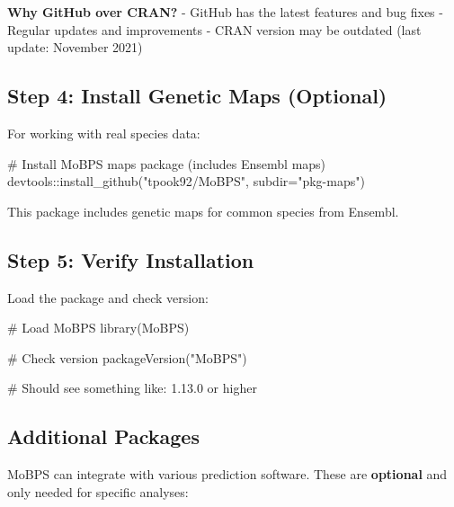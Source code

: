\documentclass[
  letterpaper,
]{book}
\newenvironment{Shaded}{\begin{snugshade}}{\end{snugshade}}
\newcommand{\AttributeTok}[1]{\textcolor[rgb]{0.40,0.45,0.13}{#1}}
\newcommand{\CommentTok}[1]{\textcolor[rgb]{0.37,0.37,0.37}{#1}}
\newcommand{\FunctionTok}[1]{\textcolor[rgb]{0.28,0.35,0.67}{#1}}
\newcommand{\NormalTok}[1]{\textcolor[rgb]{0.00,0.23,0.31}{#1}}
\newcommand{\SpecialCharTok}[1]{\textcolor[rgb]{0.37,0.37,0.37}{#1}}
\newcommand{\StringTok}[1]{\textcolor[rgb]{0.13,0.47,0.30}{#1}}
\begin{document}
\textbf{Why GitHub over CRAN?} - GitHub has the latest features and bug
fixes - Regular updates and improvements - CRAN version may be outdated
(last update: November 2021)

\subsection{Step 4: Install Genetic Maps
(Optional)}\label{step-4-install-genetic-maps-optional}

For working with real species data:

\begin{Shaded}
\begin{Highlighting}[]
\CommentTok{\# Install MoBPS maps package (includes Ensembl maps)}
\NormalTok{devtools}\SpecialCharTok{::}\FunctionTok{install\_github}\NormalTok{(}\StringTok{"tpook92/MoBPS"}\NormalTok{, }\AttributeTok{subdir=}\StringTok{"pkg{-}maps"}\NormalTok{)}
\end{Highlighting}
\end{Shaded}

This package includes genetic maps for common species from Ensembl.

\subsection{Step 5: Verify
Installation}\label{step-5-verify-installation}

Load the package and check version:

\begin{Shaded}
\begin{Highlighting}[]
\CommentTok{\# Load MoBPS}
\FunctionTok{library}\NormalTok{(MoBPS)}

\CommentTok{\# Check version}
\FunctionTok{packageVersion}\NormalTok{(}\StringTok{"MoBPS"}\NormalTok{)}

\CommentTok{\# Should see something like: \textquotesingle{}1.13.0\textquotesingle{} or higher}
\end{Highlighting}
\end{Shaded}

\subsection{Additional Packages}\label{additional-packages}

MoBPS can integrate with various prediction software. These are
\textbf{optional} and only needed for specific analyses:
\end{document}
